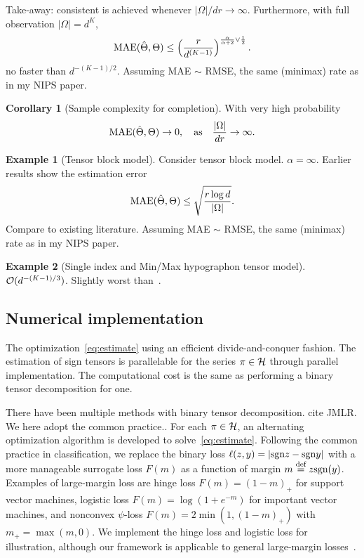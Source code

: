 \documentclass{article}
\theoremstyle{plain}
\theoremstyle{definition}
\newtheorem{cor}{Corollary}
\newtheorem{example}{Example}
\def\sign{\textup{sgn}}
\begin{document}
Take-away: consistent is achieved whenever $|\Omega|/dr\to\infty$. Furthermore, with full observation $|\Omega|=d^K$, 
\[
\textup{MAE}(\hat \Theta, \Theta)\leq \left(r\over d^{(K-1)}\right)^{{\alpha \over \alpha+2} \vee {1\over 2}}.
\]
no faster than $d^{-(K-1)/2}$. Assuming MAE $\sim$ RMSE, the same (minimax) rate as in my NIPS paper. 

\begin{cor}[Sample complexity for completion] With very high probability 
\[
\textup{MAE}(\hat \Theta, \Theta)\to 0, \quad \text{as}\quad {|\Omega|\over dr}\to \infty.
\]
\end{cor}


\begin{example}[Tensor block model]
Consider tensor block model. $\alpha=\infty$. Earlier results show the estimation error
\[
\textup{MAE}(\hat \Theta, \Theta)\leq \sqrt{r\log d \over |\Omega|}.
\]
Compare to existing literature. Assuming MAE $\sim$ RMSE, the same (minimax) rate as in my NIPS paper. 
 
\end{example}
\begin{example}[Single index and Min/Max hypographon tensor model]
$\mathcal{O}(d^{-(K-1)/3})$. Slightly worst than~\citet{ganti2015matrix}.
\end{example}

\subsection{Numerical implementation}
The optimization~\eqref{eq:estimate} using an efficient divide-and-conquer fashion. The estimation of sign tensors is parallelable for the series $\pi \in \mathcal{H}$ through parallel implementation. The computational cost is the same as performing a binary tensor decomposition for one. 

There have been multiple methods with binary tensor decomposition. cite JMLR. We here adopt the common practice.. For each $\pi\in\mathcal{H}$, an alternating optimization algorithm is developed to solve~\eqref{eq:estimate}. Following the common practice in classification, we replace the binary loss $\ell(z,y)=|\sign z - \sign y|$ with a more manageable surrogate loss $F(m)$ as a function of margin $m\stackrel{\text{def}}{=}z\sign(y)$. Examples of large-margin loss are hinge loss $F(m) = (1-m)_+$ for support vector machines, logistic loss $F(m) =\log(1+e^{-m})$ for important vector machines, and nonconvex $\psi$-loss $F(m)=2\min(1,(1-m)_+)$ with $m_{+}=\max(m,0)$. We implement the hinge loss and logistic loss for illustration, although our framework is applicable to general large-margin losses~\citep{bartlett2006convexity}. 
\end{document}
